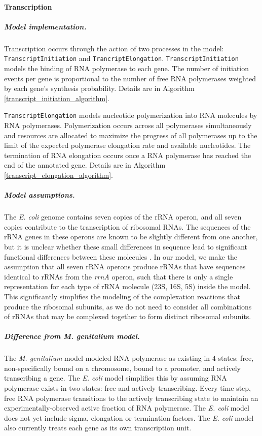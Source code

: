 \documentclass[12pt]{article}
\begin{document}
\baselineskip24pt

\paragraph{Transcription}

\subparagraph{Model implementation.}
Transcription occurs through the action of two processes in the model: \texttt{TranscriptInitiation} and \texttt{TrancriptElongation}. \texttt{TranscriptInitiation} models the binding of RNA polymerase  to each gene. The number of initiation events per gene is proportional to the number of free RNA polymerases weighted by each gene's synthesis probability. Details are in Algorithm \ref{transcript_initiation_algorithm}.

\texttt{TranscriptElongation} models nucleotide polymerization into RNA molecules by RNA polymerases. Polymerization occurs across all polymerases simultaneously and resources are allocated to maximize the progress of all polymerases up to the limit of the expected polymerase elongation rate and available nucleotides. The termination of RNA elongation occurs once a RNA polymerase has reached the end of the annotated gene. Details are in Algorithm \ref{transcript_elongation_algorithm}.

\subparagraph{Model assumptions.}
The \emph{E. coli} genome contains seven copies of the rRNA operon, and all seven copies contribute to the transcription of ribosomal RNAs. The sequences of the rRNA genes in these operons are known to be slightly different from one another, but it is unclear whether these small differences in sequence lead to significant functional differences between these molecules \cite{maeda2015strength}. In our model, we make the assumption that all seven rRNA operons produce rRNAs that have sequences identical to rRNAs from the \emph{rrnA} operon, such that there is only a single representation for each type of rRNA molecule (23S, 16S, 5S) inside the model. This significantly simplifies the modeling of the complexation reactions that produce the ribosomal subunits, as we do not need to consider all combinations of rRNAs that may be complexed together to form distinct ribosomal subunits.


\subparagraph{Difference from \emph{M. genitalium} model.}
The \emph{M. genitalium} model modeled RNA polymerase as existing in 4 states: free, non-specifically bound on a chromosome, bound to a promoter, and actively transcribing a gene. The \emph{E. coli} model simplifies this by assuming RNA polymerase exists in two states: free and actively transcribing. Every time step, free RNA polymerase transitions to the actively transcribing state to maintain an experimentally-observed active fraction of RNA polymerase. The \emph{E. coli} model does not yet include sigma, elongation or termination factors. The \textit{E. coli} model also currently treats each gene as its own transcription unit.\\
\end{document}
